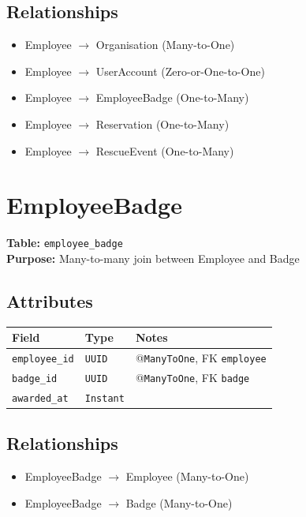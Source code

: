 \documentclass[a4paper,11pt]{article}
\begin{document}
\subsection*{Relationships}
\begin{itemize}
  \item Employee $\rightarrow$ Organisation (Many-to-One)
  \item Employee $\rightarrow$ UserAccount (Zero-or-One-to-One)
  \item Employee $\rightarrow$ EmployeeBadge (One-to-Many)
  \item Employee $\rightarrow$ Reservation (One-to-Many)
  \item Employee $\rightarrow$ RescueEvent (One-to-Many)
\end{itemize}

\section{EmployeeBadge}

\textbf{Table:} \texttt{employee\_badge} \\
\textbf{Purpose:} Many-to-many join between Employee and Badge \\

\subsection*{Attributes}
\begin{longtable}{|p{4cm}|p{3cm}|p{6cm}|}
\hline
\textbf{Field} & \textbf{Type} & \textbf{Notes} \\
\hline
\texttt{employee\_id} & \texttt{UUID} & @\texttt{ManyToOne}, FK \texttt{employee} \\
\texttt{badge\_id} & \texttt{UUID} & @\texttt{ManyToOne}, FK \texttt{badge} \\
\texttt{awarded\_at} & \texttt{Instant} &  \\
\hline
\end{longtable}



\subsection*{Relationships}
\begin{itemize}
  \item EmployeeBadge $\rightarrow$ Employee (Many-to-One)
  \item EmployeeBadge $\rightarrow$ Badge (Many-to-One)
\end{itemize}
\end{document}
